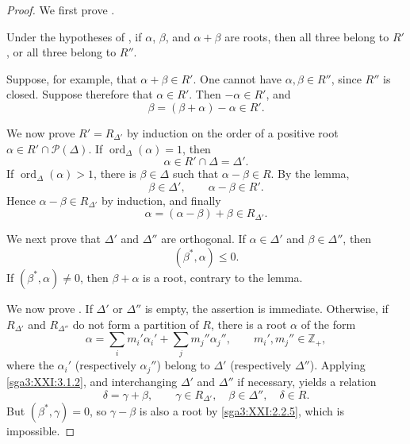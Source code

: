 \begin{proof}
We first prove .

\begin{lemma}\label{sga3:XXI:7.1.2}
Under the hypotheses of \textup{}, if
\(\alpha\), \(\beta\), and \(\alpha+\beta\) are roots, then all
three belong to \(R'\), or all three belong to \(R''\).
\end{lemma}

Suppose, for example, that \(\alpha+\beta\in R'\). One cannot have
\(\alpha,\beta\in R''\), since \(R''\) is closed. Suppose therefore
that \(\alpha\in R'\). Then \(-\alpha\in R'\), and
\[
 \beta=(\beta+\alpha)-\alpha\in R'.
\]

We now prove \(R'=R_{\Delta'}\) by induction on the order of a
positive root \(\alpha\in R'\cap\mathscr P(\Delta)\). If
\(\operatorname{ord}_\Delta(\alpha)=1\), then
\[
 \alpha\in R'\cap\Delta=\Delta'.
\]
If \(\operatorname{ord}_\Delta(\alpha)>1\), there is
\(\beta\in\Delta\) such that \(\alpha-\beta\in R\). By the lemma,
\[
 \beta\in\Delta',
 \qquad
 \alpha-\beta\in R'.
\]
Hence \(\alpha-\beta\in R_{\Delta'}\) by induction, and finally
\[
 \alpha=(\alpha-\beta)+\beta\in R_{\Delta'}.
\]

We next prove that \(\Delta'\) and \(\Delta''\) are orthogonal. If
\(\alpha\in\Delta'\) and \(\beta\in\Delta''\), then
\[
 (\beta^\ast,\alpha)\leq0.
\]
If \((\beta^\ast,\alpha)\neq0\), then \(\beta+\alpha\) is a root,
contrary to the lemma.

We now prove . If \(\Delta'\) or \(\Delta''\) is empty, the
assertion is immediate. Otherwise, if \(R_{\Delta'}\) and
\(R_{\Delta''}\) do not form a partition of \(R\), there is a root
\(\alpha\) of the form
\[
 \alpha=\sum_i m_i'\alpha_i'
       +\sum_j m_j''\alpha_j'',
 \qquad
 m_i',m_j''\in\mathbb Z_+,
\]
where the \(\alpha_i'\) (respectively \(\alpha_j''\)) belong to
\(\Delta'\) (respectively \(\Delta''\)). Applying
\ref{sga3:XXI:3.1.2}, and interchanging \(\Delta'\) and
\(\Delta''\) if necessary, yields a relation
\[
 \delta=\gamma+\beta,
 \qquad
 \gamma\in R_{\Delta'},
 \quad
 \beta\in\Delta'',
 \quad
 \delta\in R.
\]
But \((\beta^\ast,\gamma)=0\), so
\(\gamma-\beta\) is also a root by \ref{sga3:XXI:2.2.5}, which is
impossible.
\end{proof}
